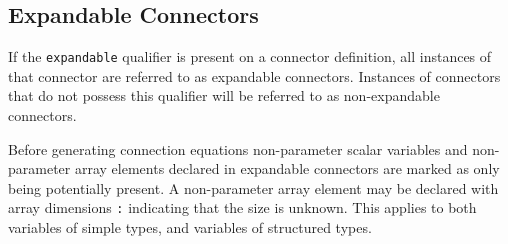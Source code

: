 \subsection{Expandable Connectors}

If the \lstinline!expandable! qualifier is present on a connector definition, all
instances of that connector are referred to as expandable connectors.
Instances of connectors that do not possess this qualifier will be
referred to as non-expandable connectors.

Before generating connection equations non-parameter scalar variables
and non-parameter array elements declared in expandable connectors are
marked as only being potentially present. A non-parameter array element
may be declared with array dimensions \lstinline!:! indicating that the size is
unknown. This applies to both variables of simple types, and variables
of structured types.

